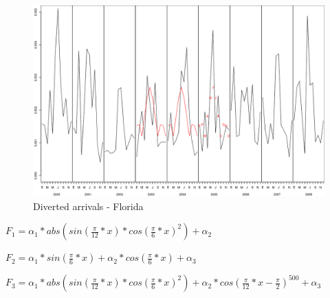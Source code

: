 \begin{figure}[h!]
  \begin{center}
	\includegraphics[scale=0.5]{img/plot_FL_2003-2005.png}
	\caption{Diverted arrivals - Florida}
  \end{center}
\end{figure}

$F_1 = \alpha_1 * abs(sin(\frac{\pi}{12}*x) * cos(\frac{\pi}{6}*x)^2) + \alpha_2$

$F_2 = \alpha_1 * sin(\frac{\pi}{6}*x) + \alpha_2 * cos(\frac{\pi}{6}*x) + \alpha_3$

$F_3 = \alpha_1 * abs(sin(\frac{\pi}{12}*x) * cos(\frac{\pi}{6}*x)^2) + \alpha_2 * cos(\frac{\pi}{12}*x - \frac{\pi}{2})^{500} + \alpha_3$
